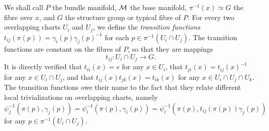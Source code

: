 \documentclass[
final,
11pt,
a4paper,
DIV=11,
headinclude=true,
footinclude=false,
bibliography=totoc,
twoside=true,  %
BCOR=5mm
]{scrbook}
\begin{document}
We shall call $P$ the bundle manifold, $\mathcal{M}$ the base 
manifold, $\pi^{-1}(x) \simeq G$ the fibre over $x$, and $G$ the 
structure group or typical fibre of $P$. For every two 
overlapping charts $U_i$ and $U_j$, we define the 
\emph{transition functions} $t_{ij}(\pi(p)) 
= \gamma_i(p){\gamma_j(p)}^{-1}$ for each $p \in \pi^{-1}(U_i 
\cap U_j)$.  The transition functions are constant on the fibres 
of $P$, so that they are mappings
\begin{equation*}
  t_{ij} : U_i \cap U_j \to G.
\end{equation*}
It is directly verified that $t_{ii}(x) = e$ for any $x \in U_i$, 
that $t_{ji}(x) = {t_{ij}(x)}^{-1}$ for any $x \in U_i \cap U_j$, 
and that $t_{ij}(x) t_{jk}(x) = t_{ik}(x)$ for any $x \in U_i 
\cap U_j \cap U_k$. The transition functions owe their name to 
the fact that they relate different local trivializations on 
overlapping charts, namely $\psi^{-1}_j(\pi(p),\gamma_j(p)) 
= \psi^{-1}_i(\pi(p),\gamma_i(p)) 
= \psi^{-1}_i(\pi(p),t_{ij}(\pi(p))\gamma_j(p))$ for any $p \in 
\pi^{-1}(U_i \cap U_j)$.
\end{document}
